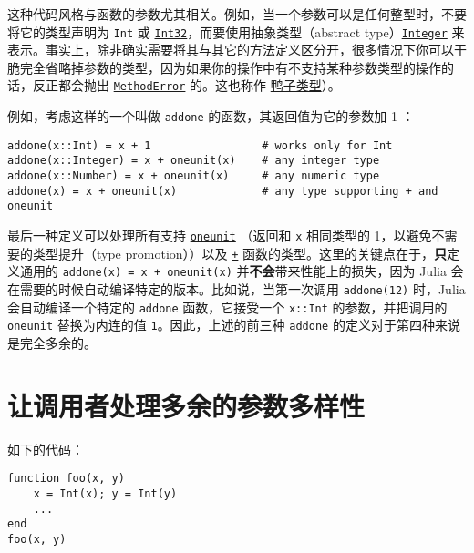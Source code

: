 这种代码风格与函数的参数尤其相关。例如，当一个参数可以是任何整型时，不要将它的类型声明为 \texttt{Int} 或 \hyperlink{10103694114785108551}{\texttt{Int32}}，而要使用抽象类型（abstract type）\hyperlink{8469131683393450448}{\texttt{Integer}} 来表示。事实上，除非确实需要将其与其它的方法定义区分开，很多情况下你可以干脆完全省略掉参数的类型，因为如果你的操作中有不支持某种参数类型的操作的话，反正都会抛出 \hyperlink{68769522931907606}{\texttt{MethodError}} 的。这也称作 \href{https://zh.wikipedia.org/wiki/\%E9\%B8\%AD\%E5\%AD\%90\%E7\%B1\%BB\%E5\%9E\%8B}{鸭子类型}）。



例如，考虑这样的一个叫做 \texttt{addone} 的函数，其返回值为它的参数加 1 ：




\begin{verbatim}
addone(x::Int) = x + 1                 # works only for Int
addone(x::Integer) = x + oneunit(x)    # any integer type
addone(x::Number) = x + oneunit(x)     # any numeric type
addone(x) = x + oneunit(x)             # any type supporting + and oneunit
\end{verbatim}



最后一种定义可以处理所有支持 \hyperlink{2310843180104103470}{\texttt{oneunit}} （返回和 \texttt{x} 相同类型的 1，以避免不需要的类型提升（type promotion））以及 \hyperlink{3677358729494553841}{\texttt{+}} 函数的类型。这里的关键点在于，\textbf{只}定义通用的 \texttt{addone(x) = x + oneunit(x)} 并\textbf{不会}带来性能上的损失，因为 Julia 会在需要的时候自动编译特定的版本。比如说，当第一次调用 \texttt{addone(12)} 时，Julia 会自动编译一个特定的 \texttt{addone} 函数，它接受一个 \texttt{x::Int} 的参数，并把调用的 \texttt{oneunit} 替换为内连的值 \texttt{1}。因此，上述的前三种 \texttt{addone} 的定义对于第四种来说是完全多余的。



\hypertarget{14005859971102001375}{}


\section{让调用者处理多余的参数多样性}



如下的代码：




\begin{verbatim}
function foo(x, y)
    x = Int(x); y = Int(y)
    ...
end
foo(x, y)
\end{verbatim}



